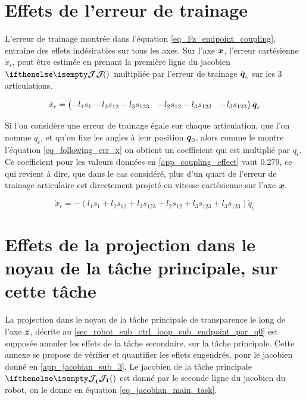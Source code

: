 \begin{appendices}
	\newpage
	\section{Effets de l'erreur de trainage} \label{app_latency_error_effect}

	L'erreur de trainage montrée dans l'équation \cref{eq_Fz_endpoint_coupling}, entraîne des effets indésirables sur tous les axes. Sur l'axe $ \vect{x} $, l'erreur cartésienne $ \dot{x}_\epsilon $, peut être estimée en prenant la première ligne du jacobien $ \jacobian{}{}{} $ multipliée par l'erreur de trainage $ \dot{\vect{q}}_{\epsilon} $ sur les 3 articulations.
	
	\begin{equation}
		\dot{x}_\epsilon = \begin{pmatrix}
		-l_1 s_1 - l_2 s_{12} - l_3 s_{123} & -l_2 s_{12} - l_3 s_{123}  & -l_3 s_{123}
		\end{pmatrix} \dot{\vect{q}}_\epsilon
	\end{equation}

	Si l'on considère une erreur de trainage égale sur chaque articulation, que l'on nomme $ \dot{q}_\epsilon $, et qu'on fixe les angles à leur position $ \vect{q}_0 $, alors comme le montre l'équation \cref{eq_following_err_x} on obtient un coefficient qui est multiplié par $ \dot{q}_\epsilon $. Ce coefficient pour les valeurs données en \cref{app_coupling_effect} vaut 0.279, ce qui revient à dire, que dans le cas considéré, plus d'un quart de l'erreur de trainage articulaire est directement projeté en vitesse cartésienne sur l'axe $ \vect{x} $.
	
	\begin{equation} \label{eq_following_err_x}
	\dot{x}_\epsilon = -(l_1 s_1 + l_2 s_{12} + l_3 s_{123} + l_2 s_{12} + l_3 s_{123} + l_3 s_{123}) \dot{q}_\epsilon
	\end{equation}

	\newpage
	\section{Effets de la projection dans le noyau de la tâche principale, sur cette tâche} \label{app_projection_effects_on_main_task}

	La projection dans le noyau de la tâche principale de transparence le long de l'axe $ \vect{z} $, décrite au \cref{sec_robot_sub_ctrl_loop_sub_endpoint_par_q0} est supposée annuler les effets de la tâche secondaire, sur la tâche principale. Cette annexe se propose de vérifier et quantifier les effets engendrés, pour le jacobien donné en \cref{app_jacobian_sub_3}.
	\newlineBlank
	Le jacobien de la tâche principale $ \jacobian{}{1}{} $ est donné par le seconde ligne du jacobien du robot, on le donne en équation \cref{eq_jacobian_main_task}.
	

\end{appendices}

